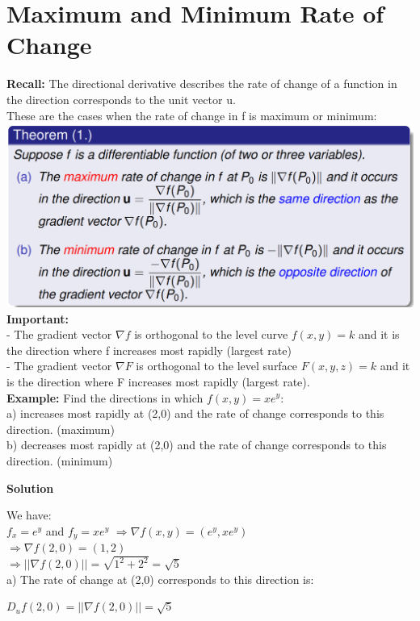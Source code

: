 \documentclass{article}
\begin{document}
\section{Maximum and Minimum Rate of Change}
\textbf{Recall:} The directional derivative describes the rate of change of a function in the direction corresponds to the unit vector u.\\
These are the cases when the rate of change in f is maximum or minimum:\\
\includegraphics[width=1\linewidth]{2.png}
\textbf{Important: }\\
- The gradient vector $\nabla f$ is orthogonal to the level curve $f(x, y) = k$ and it is the direction where f increases most rapidly (largest rate)\\
- The gradient vector $\nabla F$ is orthogonal to the level surface
$F(x, y, z) = k$ and it is the direction where F increases most
rapidly (largest rate).\\
\textbf{Example: }Find the directions in which $f(x,y)=xe^y$:\\
a) increases most rapidly at (2,0) and the rate of change corresponds to this direction. (maximum)\\
b) decreases most rapidly at (2,0) and the rate of change corresponds to this direction. (minimum)
\begin{center}
    \textbf{Solution}
\end{center}
We have:\\
$f_x=e^y$ and 
$f_y=xe^y$ 
$\Rightarrow\nabla f(x,y)=(e^y,xe^y)$ \\
$\Rightarrow\nabla f(2,0)=(1,2)$\\
$\Rightarrow||\nabla f(2,0)||=\sqrt{1^2+2^2}=\sqrt{5}$\\
a) The rate of change at (2,0) corresponds to this direction is:
\begin{center}
    $D_uf(2,0)=||\nabla f(2,0)||=\sqrt{5}$
\end{center}
\end{document}
